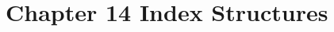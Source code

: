 \documentclass[../../main.tex]{subfiles}
\begin{document}
\section{Chapter 14 Index Structures}


\end{document}

